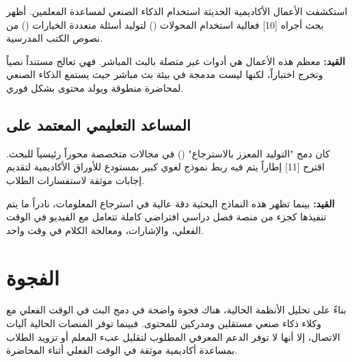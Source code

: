 استكشفت الأعمال الأكاديمية الحديثة استخدام الذكاء الصنعي لمساعدة المعلمين. أظهر بحث أجراه [10] فعالية استخدام المحولات () لتوليد أسئلة متعددة الخيارات () من نصوص الكتب المدرسية.

\textbf{القيد:} معظم هذه الأعمال هي أدوات غير متصلة بالبث المباشر. فهي تعالج مستنداً نصياً وتخرج اختباراً، لكنها ليست مدمجة في بيئة بث مباشر حيث يستمع الذكاء الصنعي لمحاضرة منطوقة ويولد محتوى بشكل فوري.

\subsection{المساعد التعليمي المعتمد على }

كان دمج "التوليد المعزز بالاسترجاع" () في مجالات متخصصة محوراً رئيسياً للبحث. اقترح [11] إطاراً يتم فيه ربط نموذج لغوي كبير بمستودع للأوراق الأكاديمية لتقديم إجابات موثقة لاستفسارات الطلاب.

\textbf{القيد:} بينما تظهر هذه النماذج البحثية دقة عالية في استرجاع المعلومات، نادراً ما يتم تنفيذها كجزء من منصة فصل دراسي افتراضي كاملة تتعامل مع الفيديو في الوقت الفعلي، والإشارات، ومعالجة الكلام في وقت واحد.

\section{الفجوة}

بناءً على تحليل الأنظمة الحالية، هناك فجوة واضحة في دمج البث في الوقت الفعلي مع وكلاء ذكاء صنعي مستقلين ومدركين للمحتوى. فبينما توفر المنصات الحالية آليات الاتصال، إلا أنها لا توفر الدعم المعرفي المطلوب لتقليل عبء المعلم أو تزويد الطلاب بمساعدة أكاديمية موثقة في الوقت الفعلي أثناء المحاضرة.
